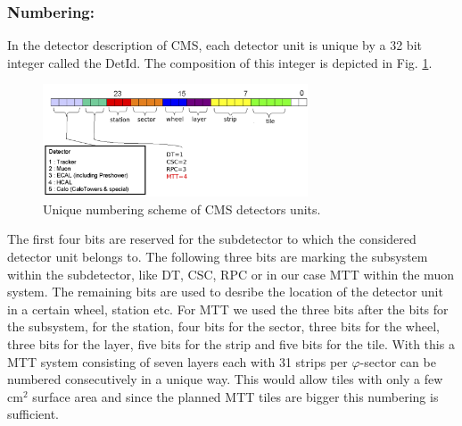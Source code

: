 			\subsubsection*{Numbering:}
			In the detector description of CMS, each detector unit is unique by a 32 bit integer called the DetId.
			The composition of this integer is depicted in Fig. \ref{fig:numbering}.
			\begin{figure}[htbp]
				\centering
				\includegraphics[width=0.70\textwidth]{Figures/erdogan/numbering.png}
				\caption{Unique numbering scheme of CMS detectors units.}
				\label{fig:numbering}
			\end{figure}
			The first four bits are reserved for the subdetector to which the considered detector unit belongs to.
			The following three bits are marking the subsystem within the subdetector, like DT, CSC, RPC or in our case MTT within the muon system.
			The remaining bits are used to desribe the location of the detector unit in a certain wheel, station etc.
			For MTT we used the three bits after the bits for the subsystem, for the station, four bits for the sector, three bits for the wheel, three bits for the layer, five bits for the strip and five bits
			for the tile.
			With this a MTT system consisting of seven layers each with 31 strips per $\varphi$-sector can be numbered consecutively in a unique way.
			This would allow tiles with only a few cm$^2$ surface area and since the planned MTT tiles are bigger this numbering is sufficient.
